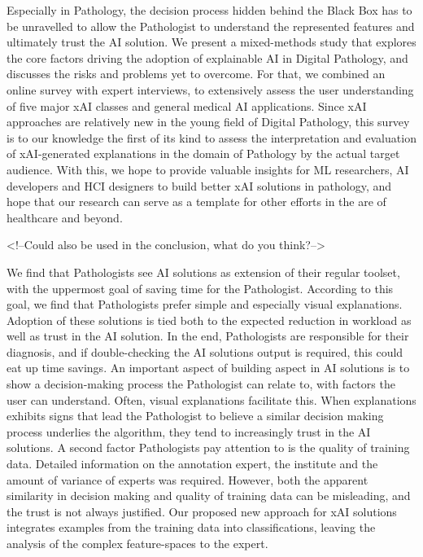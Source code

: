 Especially in Pathology, the decision process hidden behind the Black Box has to be unravelled to allow the Pathologist to understand the represented features and ultimately trust the AI solution. We present a mixed-methods study that explores the core factors driving the adoption of explainable AI in Digital Pathology, and discusses the risks and problems yet to overcome. For that, we combined an online survey with expert interviews, to extensively assess the user understanding of five major xAI classes and general medical AI applications.
Since xAI approaches are relatively new in the young field of Digital Pathology, this survey is to our knowledge the first of its kind to assess the interpretation and evaluation of xAI-generated explanations in the domain of Pathology by the actual target audience. With this, we hope to provide valuable insights for ML researchers, AI developers and HCI designers to build better xAI solutions in pathology, and hope that our research can serve as a template for other efforts in the are of healthcare and beyond. 

<!--Could also be used in the conclusion, what do you think?-->

We find that Pathologists see AI solutions as extension of their regular toolset, with the uppermost goal of saving time for the Pathologist. According to this goal, we find that Pathologists prefer simple and especially visual explanations. Adoption of these solutions is tied both to the expected reduction in workload as well as trust in the AI solution. In the end, Pathologists are responsible for their diagnosis, and if double-checking the AI solutions output is required, this could eat up time savings.
An important aspect of building aspect in AI solutions is to show a decision-making process the Pathologist can relate to, with factors the user can understand. Often, visual explanations facilitate this. When explanations exhibits signs that lead the Pathologist to believe a similar decision making process underlies the algorithm, they tend to increasingly trust in the AI solutions. 
A second factor Pathologists pay attention to is the quality of training data. Detailed information on the annotation expert, the institute and the amount of variance of experts was required. 
However, both the apparent similarity in decision making and quality of training data can be misleading, and the trust is not always justified.
Our proposed new approach for xAI solutions integrates examples from the training data into classifications, leaving the analysis of the complex feature-spaces to the expert.